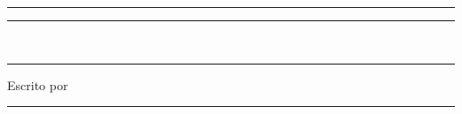 %

\begin{titlepage}

    \centering

    \rule{\textwidth}{2pt} %

    \vspace*{\baselineskip}

    \rule{\textwidth}{1pt} %

    \vspace{0.75\baselineskip} %

    {\thetitle\\}

    \vspace{0.75\baselineskip} %

    \rule{\textwidth}{1pt} %

    \vspace{2\baselineskip}

    \thedescription

    \vspace*{3\baselineskip}

    Escrito por

    \vspace{0.5\baselineskip}

    {\Large \theauthor}

    \vspace{0.5\baselineskip}

    \textit{\theinstitution}

    \vfill %


    \vspace{0.3\baselineskip}

    {\large\thedate}

    \rule{\textwidth}{2pt} %

\end{titlepage}
